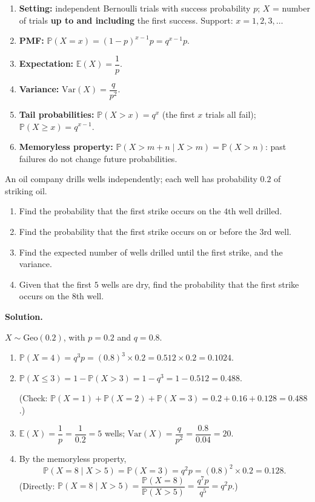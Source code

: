 \documentclass[11pt]{article}
\begin{document}
\begin{methode}
\begin{enumerate}
\item \textbf{Setting:} independent Bernoulli trials with success probability $p$; $X$ = number of trials \textbf{up to and including} the first success. Support: $x = 1,2,3,\dots$
\item \textbf{PMF:} $\mathbb{P}(X = x) = (1-p)^{x-1}p = q^{x-1}p$.
\item \textbf{Expectation:} $\mathbb{E}(X) = \dfrac{1}{p}$.
\item \textbf{Variance:} $\mathrm{Var}(X) = \dfrac{q}{p^2}$.
\item \textbf{Tail probabilities:} $\mathbb{P}(X > x) = q^x$ (the first $x$ trials all fail); $\mathbb{P}(X \ge x) = q^{x-1}$.
\item \textbf{Memoryless property:} $\mathbb{P}(X > m+n \mid X > m) = \mathbb{P}(X > n)$: past failures do not change future probabilities.
\end{enumerate}
\end{methode}

\begin{exoresolu}
An oil company drills wells independently; each well has probability $0.2$ of striking oil.
\begin{enumerate}
\item Find the probability that the first strike occurs on the $4$th well drilled.
\item Find the probability that the first strike occurs on or before the $3$rd well.
\item Find the expected number of wells drilled until the first strike, and the variance.
\item Given that the first $5$ wells are dry, find the probability that the first strike occurs on the $8$th well.
\end{enumerate}
\tcblower
\textbf{Solution.}

$X \sim \mathrm{Geo}(0.2)$, with $p = 0.2$ and $q = 0.8$.
\begin{enumerate}
\item $\mathbb{P}(X = 4) = q^3 p = (0.8)^3 \times 0.2 = 0.512 \times 0.2 = 0.1024$.
\item $\mathbb{P}(X \le 3) = 1 - \mathbb{P}(X > 3) = 1 - q^3 = 1 - 0.512 = 0.488$.

(Check: $\mathbb{P}(X=1)+\mathbb{P}(X=2)+\mathbb{P}(X=3) = 0.2 + 0.16 + 0.128 = 0.488$.)
\item $\mathbb{E}(X) = \dfrac{1}{p} = \dfrac{1}{0.2} = 5$ wells; \quad $\mathrm{Var}(X) = \dfrac{q}{p^2} = \dfrac{0.8}{0.04} = 20$.
\item By the memoryless property,
\[
\mathbb{P}(X = 8 \mid X > 5) = \mathbb{P}(X = 3) = q^2 p = (0.8)^2 \times 0.2 = 0.128.
\]
(Directly: $\mathbb{P}(X=8 \mid X>5) = \dfrac{\mathbb{P}(X=8)}{\mathbb{P}(X>5)} = \dfrac{q^7 p}{q^5} = q^2 p$.)
\end{enumerate}
\end{exoresolu}
\end{document}
